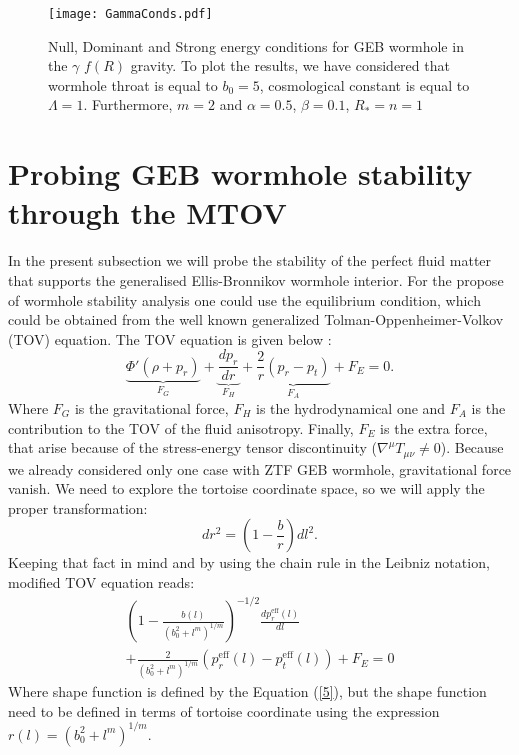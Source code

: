 \begin{widetext}

\begin{figure}[!htbp]
    \centering
    \texttt{[image: GammaConds.pdf]}
    \caption{Null, Dominant and Strong energy conditions for GEB wormhole in the $\gamma$ $f(R)$ gravity. To plot the results, we have considered that wormhole throat is equal to $b_0=5$, cosmological constant is equal to $\Lambda=1$. Furthermore, $m=2$ and $\alpha=0.5$, $\beta=0.1$, $R_*=n=1$}
    \label{fig:3}
\end{figure}

\end{widetext}

\section{Probing GEB wormhole stability through the MTOV}\label{sec4}

In the present subsection we will probe the stability of the perfect fluid matter that supports the generalised Ellis-Bronnikov wormhole interior.
For the propose of wormhole stability analysis one could use the equilibrium condition, which could be obtained from the well known generalized Tolman-Oppenheimer-Volkov (TOV) equation. The TOV equation is given below \cite{ref77,ref78}:
\begin{equation}
    \underbrace{\Phi'(\rho+p_r)}_\text{$F_G$}+\underbrace{\frac{dp_r}{dr}}_\text{$F_H$}+\underbrace{\frac{2}{r}(p_r-p_t)}_\text{$F_A$}+F_{E}=0.
    \label{eq:33}
\end{equation}
Where $F_G$ is the gravitational force, $F_H$ is the hydrodynamical one and $F_A$ is the contribution to the TOV of the fluid anisotropy. Finally, $F_E$ is the extra force, that arise because of the stress-energy tensor discontinuity ($\nabla^\mu T_{\mu\nu}\neq0$). Because we already considered only one case with ZTF GEB wormhole, gravitational force vanish. We need to explore the tortoise coordinate space, so we will apply the proper transformation:
\begin{equation}
dr^2=\left(1-\frac{b}{r}\right)dl^2.
\end{equation}
Keeping that fact in mind and by using the chain rule in the Leibniz notation, modified TOV equation reads:
\begin{multline}
\left(1-\frac{b(l)}{(b_0^2+l^m)^{1/m}}\right)^{-1/2}\frac{dp_r^{\mathrm{eff}}(l)}{dl}\\
 +\frac{2}{(b_0^2+l^m)^{1/m}}(p_r^{\mathrm{eff}}(l)-p_t^{\mathrm{eff}}(l))+F_{E}=0
 \label{eq:30}
\end{multline}
Where shape function is defined by the Equation (\ref{5}), but the shape function need to be defined in terms of tortoise coordinate using the expression $r(l)=(b_0^2+l^m)^{1/m}$.


